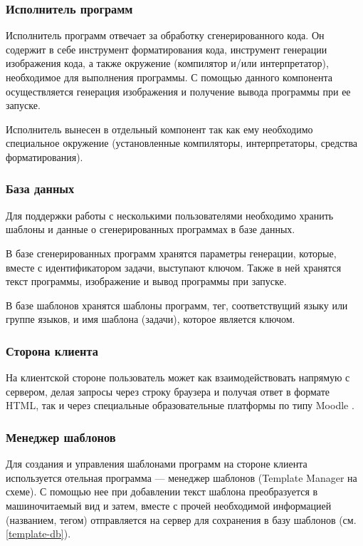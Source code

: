 \subsubsection{Исполнитель программ} \label{executor}
Исполнитель программ отвечает за обработку сгенерированного
кода. Он содержит в себе инструмент форматирования кода, инструмент генерации изображения
кода, а также окружение (компилятор и/или интерпретатор), необходимое для выполнения
программы. С помощью данного компонента осуществляется генерация изображения и получение
вывода программы при ее запуске.

Исполнитель вынесен в отдельный компонент так как ему необходимо специальное окружение
(установленные компиляторы, интерпретаторы, средства форматирования).

\subsubsection{База данных}
\label{db-model}
Для поддержки работы с несколькими пользователями необходимо хранить шаблоны и данные о
сгенерированных программах в базе данных.

В базе сгенерированных программ хранятся параметры генерации,
которые, вместе с
идентификатором задачи, выступают ключом. Также в ней хранятся текст программы,
изображение и вывод программы при запуске.

\label{template-db} В базе шаблонов хранятся шаблоны программ, тег, соответствущий языку или группе
языков, и имя шаблона (задачи), которое является ключом.

\subsubsection{Сторона клиента}
На клиентской стороне пользователь может как взаимодействовать напрямую с сервером,
делая запросы через строку браузера и получая ответ в формате HTML, так и через
специальные образовательные платформы по типу Moodle \cite{moodle}.

\subsubsection{Менеджер шаблонов}
Для создания и управления шаблонами программ на стороне клиента используется отельная
программа --- менеджер шаблонов (Template Manager на схеме). С помощью нее при добавлении текст шаблона
преобразуется в машиночитаемый вид
и затем, вместе с прочей необходимой информацией (названием, тегом) отправляется на сервер
для сохранения в базу шаблонов (см. \ref{template-db}).
